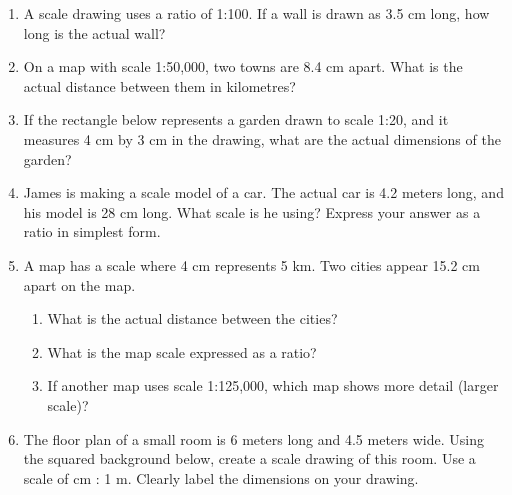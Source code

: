 \documentclass[12pt,a4paper]{article}
\begin{document}
\begin{enumerate}

\item A scale drawing uses a ratio of 1:100. If a wall is drawn as 3.5 cm long, how long is the actual wall?

\item On a map with scale 1:50,000, two towns are 8.4 cm apart. What is the actual distance between them in kilometres?

\item 

If the rectangle below represents a garden drawn to scale 1:20, and it measures 4 cm by 3 cm in the drawing, what are the actual dimensions of the garden?
\begin{center}
\end{center}

\item James is making a scale model of a car. The actual car is 4.2 meters long, and his model is 28 cm long. What scale is he using? Express your answer as a ratio in simplest form.

\item A map has a scale where 4 cm represents 5 km. Two cities appear 15.2 cm apart on the map. 
\begin{enumerate}
    \item What is the actual distance between the cities?
    \item What is the map scale expressed as a ratio?
    \item If another map uses scale 1:125,000, which map shows more detail (larger scale)?
\end{enumerate}

\item  The floor plan of a small room is 6 meters long and 4.5 meters wide. Using the squared background below, create a scale drawing of this room. Use a scale of  cm : 1 m. Clearly label the dimensions on your drawing.
\begin{center}
\end{center}

\end{enumerate}
\end{document}
